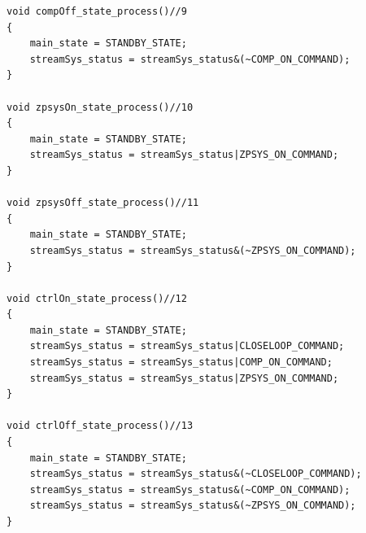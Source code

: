 \documentclass[
	article,			%
	11pt,				%
	oneside,			%
	a4paper,			%
	english,			%
	brazil,				%
	sumario=tradicional
	]{abntex2}
\begin{document}
\begin{apendicesenv}
\begin{lstlisting}
void compOff_state_process()//9
{
    main_state = STANDBY_STATE;
    streamSys_status = streamSys_status&(~COMP_ON_COMMAND); 
}

void zpsysOn_state_process()//10
{
    main_state = STANDBY_STATE;
    streamSys_status = streamSys_status|ZPSYS_ON_COMMAND; 
}

void zpsysOff_state_process()//11
{
    main_state = STANDBY_STATE;
    streamSys_status = streamSys_status&(~ZPSYS_ON_COMMAND);   
}

void ctrlOn_state_process()//12
{
    main_state = STANDBY_STATE;
    streamSys_status = streamSys_status|CLOSELOOP_COMMAND;
    streamSys_status = streamSys_status|COMP_ON_COMMAND;
    streamSys_status = streamSys_status|ZPSYS_ON_COMMAND;     
}

void ctrlOff_state_process()//13
{
    main_state = STANDBY_STATE;
    streamSys_status = streamSys_status&(~CLOSELOOP_COMMAND); 
    streamSys_status = streamSys_status&(~COMP_ON_COMMAND);
    streamSys_status = streamSys_status&(~ZPSYS_ON_COMMAND); 
}
	\end{lstlisting}
	\pagebreak
	
\end{apendicesenv}

\pagebreak
\end{document}
